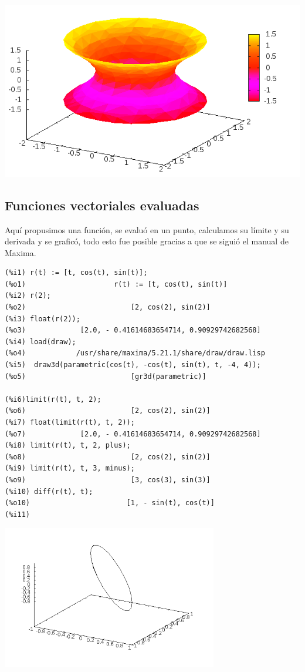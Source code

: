 \documentclass[12pt,letterpaper]{article}
\begin{document}
\begin{center}
\includegraphics[scale=0.6]{hiperboloide.png}
\end{center}



\subsection{Funciones vectoriales evaluadas}
Aquí propusimos una función, se evaluó en un  punto, calculamos su límite y su derivada y se graficó, todo esto fue posible gracias a que se siguió el manual de Maxima. 

\begin{verbatim}
(%i1) r(t) := [t, cos(t), sin(t)];
(%o1)                     r(t) := [t, cos(t), sin(t)]
(%i2) r(2);
(%o2)                         [2, cos(2), sin(2)]
(%i3) float(r(2));
(%o3)             [2.0, - 0.41614683654714, 0.90929742682568]
(%i4) load(draw);
(%o4)            /usr/share/maxima/5.21.1/share/draw/draw.lisp
(%i5)  draw3d(parametric(cos(t), -cos(t), sin(t), t, -4, 4));
(%o5)                         [gr3d(parametric)]

(%i6)limit(r(t), t, 2);
(%o6)                         [2, cos(2), sin(2)]
(%i7) float(limit(r(t), t, 2));
(%o7)             [2.0, - 0.41614683654714, 0.90929742682568]
(%i8) limit(r(t), t, 2, plus);
(%o8)                         [2, cos(2), sin(2)]
(%i9) limit(r(t), t, 3, minus);
(%o9)                         [3, cos(3), sin(3)]
(%i10) diff(r(t), t);
(%o10)                       [1, - sin(t), cos(t)]
(%i11) 
\end{verbatim}

\begin{center}
\includegraphics[scale=0.6]{funcion1.png}
\end{center}
\end{document}

